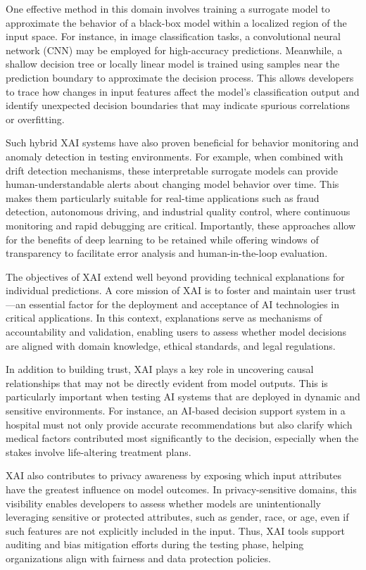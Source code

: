 \documentclass[manuscript,screen,review]{acmart}
\begin{document}
One effective method in this domain involves training a surrogate model to approximate the behavior of a black-box model within a localized region of the input space. For instance, in image classification tasks, a convolutional neural network (CNN) may be employed for high-accuracy predictions. Meanwhile, a shallow decision tree or locally linear model is trained using samples near the prediction boundary to approximate the decision process. This allows developers to trace how changes in input features affect the model's classification output and identify unexpected decision boundaries that may indicate spurious correlations or overfitting.

Such hybrid XAI systems have also proven beneficial for behavior monitoring and anomaly detection in testing environments. For example, when combined with drift detection mechanisms, these interpretable surrogate models can provide human-understandable alerts about changing model behavior over time. This makes them particularly suitable for real-time applications such as fraud detection, autonomous driving, and industrial quality control, where continuous monitoring and rapid debugging are critical. Importantly, these approaches allow for the benefits of deep learning to be retained while offering windows of transparency to facilitate error analysis and human-in-the-loop evaluation.

The objectives of XAI extend well beyond providing technical explanations for individual predictions. A core mission of XAI is to foster and maintain user trust---an essential factor for the deployment and acceptance of AI technologies in critical applications. In this context, explanations serve as mechanisms of accountability and validation, enabling users to assess whether model decisions are aligned with domain knowledge, ethical standards, and legal regulations.

In addition to building trust, XAI plays a key role in uncovering causal relationships that may not be directly evident from model outputs. This is particularly important when testing AI systems that are deployed in dynamic and sensitive environments. For instance, an AI-based decision support system in a hospital must not only provide accurate recommendations but also clarify which medical factors contributed most significantly to the decision, especially when the stakes involve life-altering treatment plans.

XAI also contributes to privacy awareness by exposing which input attributes have the greatest influence on model outcomes. In privacy-sensitive domains, this visibility enables developers to assess whether models are unintentionally leveraging sensitive or protected attributes, such as gender, race, or age, even if such features are not explicitly included in the input. Thus, XAI tools support auditing and bias mitigation efforts during the testing phase, helping organizations align with fairness and data protection policies.
\end{document}

